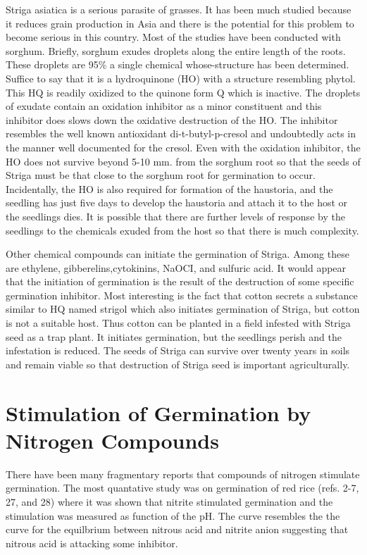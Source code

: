 Striga asiatica is a serious parasite of grasses. It has been much studied
because it reduces grain production in Asia and there is the potential for this problem
to become serious in this country. Most of the studies have been conducted with
sorghum. Briefly, sorghum exudes droplets along the entire length of the roots. These
droplets are 95\% a single chemical whose-structure has been determined. Suffice to
say that it is a hydroquinone (HO) with a structure resembling phytol. This HQ is
readily oxidized to the quinone form Q which is inactive. The droplets of exudate
contain an oxidation inhibitor as a minor constituent and this inhibitor does slows
down the oxidative destruction of the HO. The inhibitor resembles the well known
antioxidant di-t-butyl-p-cresol and undoubtedly acts in the manner well documented
for the cresol. Even with the oxidation inhibitor, the HO does not survive beyond 5-10
mm. from the sorghum root so that the seeds of Striga must be that close to the
sorghum root for germination to occur. Incidentally, the HO is also required for
formation of the haustoria, and the seedling has just five days to develop the haustoria
and attach it to the host or the seedlings dies. It is possible that there are further levels
of response by the seedlings to the chemicals exuded from the host so that there is
much complexity.

Other chemical compounds can initiate the germination of Striga. Among these
are ethylene, gibberelins,cytokinins, NaOCI, and sulfuric acid. It would appear that the
initiation of germination is the result of the destruction of some specific germination
inhibitor. Most interesting is the fact that cotton secrets a substance similar to HQ
named strigol which also initiates germination of Striga, but cotton is not a suitable
host. Thus cotton can be planted in a field infested with Striga seed as a trap plant. It
initiates germination, but the seedlings perish and the infestation is reduced. The
seeds of Striga can survive over twenty years in soils and remain viable so that
destruction of Striga seed is important agriculturally.

\section[Nitrogen Compounds]{Stimulation of Germination by Nitrogen Compounds}

There have been
many fragmentary reports that compounds of nitrogen stimulate germination. The
most quantative study was on germination of red rice (refs. 2-7, 27, and 28) where it
was shown that nitrite stimulated germination and the stimulation was measured as
function of the pH. The curve resembles the the curve for the equilbrium between
nitrous acid and nitrite anion suggesting that nitrous acid is attacking some inhibitor.

